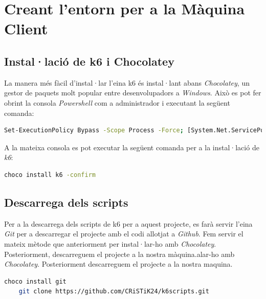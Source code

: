 \newpage \section{Creant l'entorn per a la Màquina Client} 
\label{màquina client}
\subsection{Instal·lació de k6 i Chocolatey}

La manera més fàcil d'instal·lar l'eina k6 és instal·lant abans \textit{Chocolatey}, un gestor de paquets molt popular entre desenvolupadors a \textit{Windows}. Això es pot fer obrint la consola \textit{Powershell} com a administrador i executant la següent comanda:

\begin{lstlisting}[language=bash, caption=Instal·lació de \textit{Chocolatey}]
    Set-ExecutionPolicy Bypass -Scope Process -Force; [System.Net.ServicePointManager]::SecurityProtocol = [System.Net.ServicePointManager]::SecurityProtocol -bor 3072; iex ((New-Object System.Net.WebClient).DownloadString('https://community.chocolatey.org/install.ps1'))
\end{lstlisting}

A la mateixa consola es pot executar la següent comanda per a la instal·lació de \textit{k6}:

\begin{lstlisting}[language=bash, caption=Instal·lació de k6 mediant \textit{Chocolatey}]
    choco install k6 -confirm
\end{lstlisting}

\subsection{Descarrega dels scripts}

Per a la descarrega dels scripts de k6 per a aquest projecte, es farà servir l'eina \textit{Git} per a descarregar el projecte amb el codi allotjat a \textit{Github}. Fem servir el mateix mètode que anteriorment per instal·lar-ho amb \textit{Chocolatey}. Posteriorment, descarreguem el projecte a la nostra màquina.alar-ho amb \textit{Chocolatey}. Posteriorment descarreguem el projecte a la nostra maquina.

\begin{lstlisting}[language=bash, caption=Instal·lació de git i clonació del projecte]
    choco install git
    git clone https://github.com/CRiSTiK24/k6scripts.git
\end{lstlisting}

